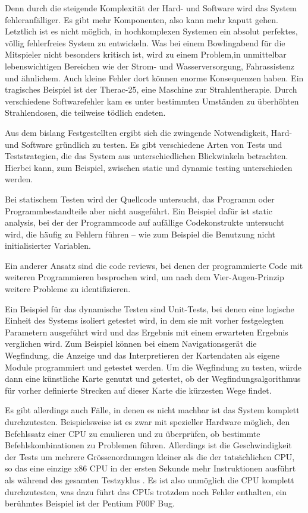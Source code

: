 Denn durch die steigende Komplexit{\"{a}}t der Hard- und Software wird das System fehleranf{\"{a}}lliger. Es gibt 
mehr Komponenten, also kann mehr kaputt gehen. Letztlich ist es nicht m{\"{o}}glich, in hochkomplexen Systemen ein 
absolut perfektes, v{\"{o}}llig fehlerfreies System zu entwickeln. 
Was bei einem Bowlingabend f{\"{u}}r die Mitspieler nicht besonders kritisch ist, wird zu einem Problem,in unmittelbar 
lebenswichtigen Bereichen wie der Strom- und Wasserversorgung, Fahrassistenz und {\"{a}}hnlichem. Auch kleine 
Fehler dort k{\"{o}}nnen enorme Konsequenzen haben. Ein tragisches Beispiel ist der Therac-25, eine Maschine zur 
Strahlentherapie. Durch verschiedene Softwarefehler kam es unter bestimmten Umst{\"{a}}nden zu {\"{u}}berh{\"{o}}hten 
Strahlendosen, die teilweise t{\"{o}}dlich endeten.

Aus dem bislang Festgestellten ergibt sich die zwingende Notwendigkeit, Hard- und Software gr{\"{u}}ndlich zu 
testen. Es gibt verschiedene Arten von Tests und Teststrategien, die das System aus unterschiedlichen Blickwinkeln 
betrachten. Hierbei kann, zum Beispiel, zwischen static und dynamic testing unterschieden werden. 

Bei statischem Testen wird der Quellcode untersucht, das Programm oder  Programmbestandteile aber nicht 
ausgef{\"{u}}hrt. Ein Beispiel daf{\"{u}}r ist static analysis, bei der der Programmcode auf auf{\"{a}}llige
Codekonstrukte untersucht wird, die h{\"{a}}ufig zu Fehlern f{\"{u}}hren -- wie zum Beispiel die Benutzung nicht 
initialisierter Variablen. 

Ein anderer Ansatz sind die code reviews, bei denen der programmierte Code mit weiteren Programmieren besprochen 
wird, um nach dem Vier-Augen-Prinzip weitere Probleme zu identifizieren.

Ein Beispiel f{\"{u}}r das dynamische Testen sind Unit-Tests, bei denen eine logische Einheit des Systems isoliert 
getestet wird, in dem sie mit vorher festgelegten Parametern ausgef{\"{u}}hrt wird und das Ergebnis mit einem 
erwarteten Ergebnis verglichen wird. Zum Beispiel k{\"{o}}nnen bei einem Navigationsger{\"{a}}t die Wegfindung, die 
Anzeige und das Interpretieren der Kartendaten als eigene Module programmiert und getestet werden. Um die 
Wegfindung zu testen, w{\"{u}}rde dann eine k{\"{u}}nstliche Karte genutzt und getestet, ob der 
Wegfindungsalgorithmus f{\"{u}}r vorher definierte Strecken auf dieser Karte die k{\"{u}}rzesten Wege findet. 

Es gibt allerdings auch F{\"{a}}lle, in denen es nicht machbar ist das System komplett durchzutesten. 
Beispielsweise ist es zwar mit spezieller Hardware m{\"{o}}glich, den Befehlssatz einer CPU zu emulieren und zu 
{\"{u}}berpr{\"{u}}fen, ob bestimmte Befehlskombinationen zu Problemen f{\"{u}}hren. Allerdings ist die 
Geschwindigkeit der Tests um mehrere Gr{\"{o}}ssenordnungen kleiner als die der tats{\"{a}}chlichen CPU, so das 
eine einzige x86 CPU in der ersten Sekunde mehr Instruktionen ausf{\"{u}}hrt als w{\"{a}}hrend des gesamten 
Testzyklus \cite{kaplan}. Es ist also unm{\"{o}}glich die CPU komplett durchzutesten, was dazu f{\"{u}}hrt das CPUs 
trotzdem noch Fehler enthalten, ein ber{\"{u}}hmtes Beispiel ist der Pentium F00F Bug.

